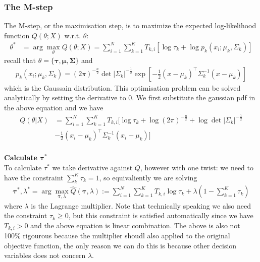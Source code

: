 \documentclass{article} [10pt] %
\newcommand{\bs}{\boldsymbol}
\begin{document}
\subsubsection{The M-step}
The M-step, or the maximisation step, is to maximize the expected log-likelihood function $Q(\theta; X)$ w.r.t. $\theta$:
\begin{align}
	\theta^* &=\arg\max_\theta Q(\theta; X)=\sum_{i=1}^N \sum_{k=1}^K T_{k, i}\left[\log\tau_k + \log p_k(x_i; \mu_k, \Sigma_k)\right]
\end{align}
recall that $\theta=\{\bs\tau, \bs\mu, \bs\Sigma\}$ and
\begin{align*}
p_k(x_i; \mu_k, \Sigma_k)= (2\pi)^{-\frac{n}{2}}\det |\Sigma_k|^{-\frac{1}{2}}\exp\left[-\frac{1}{2}(x-\mu_k)^\top\Sigma_k^{-1}(x-\mu_k)\right]
\end{align*}
which is the Gaussain distribution. This optimisation problem can be solved analytically by setting the derivative to 0. We first substitute the gaussian pdf in the above equation and we have 
\begin{align*}
Q(\theta|X)&=\sum_{i=1}^N \sum_{k=1}^K T_{k, i}[\log\tau_k + \log (2\pi)^{-\frac{n}{2}}+\log\det |\Sigma_k|^{-\frac{1}{2}}\\
	&-\frac{1}{2}(x_i-\mu_k)^\top\Sigma_k^{-1}(x_i-\mu_k)]\\
\end{align*}

\textbf{Calculate $\bs\tau^*$}\\
To calculate $\tau^*$ we take derivative against $Q$, however with one twist: we need to have the constraint $\sum_k^K\tau_k=1$, so equivaliently we are solving
\begin{align}
	\bs\tau^*, \lambda^* = \arg\max_{\bs\tau, \lambda} \hat{Q}(\bs\tau, \lambda):=\sum_{i=1}^N\sum_{k=1}^KT_{k,i}\log \tau_k + \lambda (1-\sum_{k=1}^K\tau_k)
\end{align}
where $\lambda$ is the Lagrange multiplier. Note that technically speaking we also need the constraint $\tau_k\geq 0$, but this constraint is satisfied automatically since we have $T_{k,i}>0$ and the above equation is linear combination. The above is also not 100\% rigourous because the multiplier shoudl also applied to the original objective function, the only reason we can do this is because other decision variables does not concern $\lambda$. 
\end{document}
